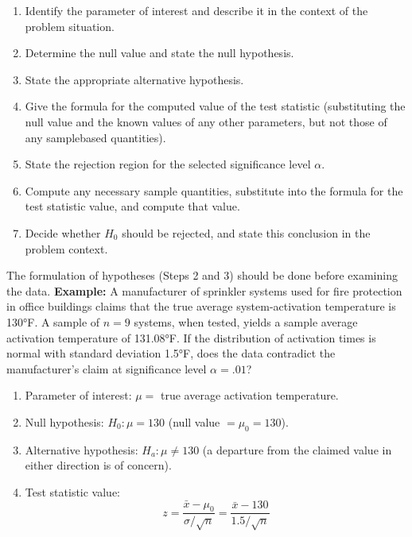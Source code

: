\documentclass{report}
\begin{document}
\begin{itemize}
    \begin{enumerate}
        \item Identify the parameter of interest and describe it in the context of the problem situation.
        \item Determine the null value and state the null hypothesis.
        \item State the appropriate alternative hypothesis.
        \item Give the formula for the computed value of the test statistic (substituting the null value and the known values of any other parameters, but not those of any samplebased quantities).
        \item State the rejection region for the selected significance level $\alpha$.
        \item Compute any necessary sample quantities, substitute into the formula for the test statistic value, and compute that value.
        \item Decide whether $H_{0}$ should be rejected, and state this conclusion in the problem context.
    \end{enumerate}
    The formulation of hypotheses (Steps 2 and 3) should be done before examining the data.
    \bigbreak \noindent 
    \textbf{Example:} 
    A manufacturer of sprinkler systems used for fire protection in office buildings claims that the true average system-activation temperature is 130°F. A sample of \( n = 9 \) systems, when tested, yields a sample average activation temperature of 131.08°F. If the distribution of activation times is normal with standard deviation 1.5°F, does the data contradict the manufacturer's claim at significance level \( \alpha = .01 \)?
    \begin{enumerate}
        \item Parameter of interest: \( \mu = \) true average activation temperature.
        \item Null hypothesis: \( H_0: \mu = 130 \) (null value \( = \mu_0 = 130 \)).
        \item Alternative hypothesis: \( H_a: \mu \neq 130 \) (a departure from the claimed value in either direction is of concern).
        \item Test statistic value:
            \[
                z = \frac{\bar{x} - \mu_0}{\sigma / \sqrt{n}} = \frac{\bar{x} - 130}{1.5 / \sqrt{n}}
            \]
    \end{enumerate}
    \bigbreak \noindent 
    \begin{enumerate}
        \setcounter{enumi}{4}

\end{enumerate}
\end{itemize}
\end{document}

